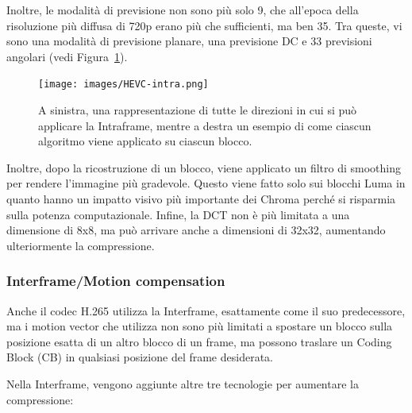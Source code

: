 \documentclass[a4paper,12pt, oneside]{article}
\begin{document}
Inoltre, le modalità di previsione non sono più solo 9, che all'epoca della risoluzione più diffusa di 720p
erano più che sufficienti, ma ben 35. Tra queste, vi sono una modalità di previsione planare, una previsione DC 
e 33 previsioni angolari (vedi Figura~\ref{fig:HEVC_intra}).

\begin{figure}[h]
    \centering
    \texttt{[image: images/HEVC-intra.png]}
    \caption{A sinistra, una rappresentazione di tutte le direzioni in cui si può applicare la Intraframe,
    mentre a destra un esempio di come ciascun algoritmo viene applicato su ciascun blocco.}
    \label{fig:HEVC_intra}
\end{figure}

Inoltre, dopo la ricostruzione di un blocco, viene applicato un filtro di smoothing per rendere
l'immagine più gradevole. Questo viene fatto solo sui blocchi Luma in quanto hanno un impatto visivo più
importante dei Chroma perché si risparmia sulla potenza computazionale.
Infine, la DCT non è più limitata a una dimensione di 8x8, ma può arrivare anche a dimensioni di 32x32,
aumentando ulteriormente la compressione.

\subsubsection{Interframe/Motion compensation}
Anche il codec H.265 utilizza la Interframe, esattamente come il suo predecessore, ma i motion vector che
utilizza non sono più limitati a spostare un blocco sulla posizione esatta di un altro blocco di un frame,
ma possono traslare un Coding Block (CB) in qualsiasi posizione del frame desiderata.

Nella Interframe, vengono aggiunte altre tre tecnologie per aumentare la compressione:
\end{document}
